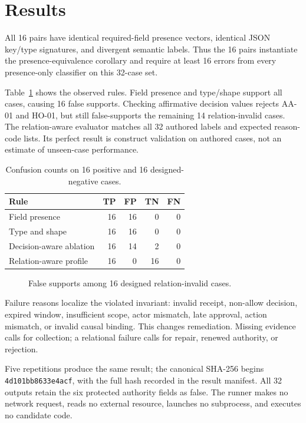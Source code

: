 \documentclass[preprint,12pt]{elsarticle}
\newcommand{\code}[1]{\texttt{#1}}
\begin{document}
\section{Results}

All 16 pairs have identical required-field presence vectors, identical JSON key/type signatures, and divergent semantic labels. Thus the 16 pairs instantiate the presence-equivalence corollary and require at least 16 errors from every presence-only classifier on this 32-case set.

Table~\ref{tab:results} shows the observed rules. Field presence and type/shape support all cases, causing 16 false supports. Checking affirmative decision values rejects AA-01 and HO-01, but still false-supports the remaining 14 relation-invalid cases. The relation-aware evaluator matches all 32 authored labels and expected reason-code lists. Its perfect result is construct validation on authored cases, not an estimate of unseen-case performance.

\begin{table}[t]
\centering
\caption{Confusion counts on 16 positive and 16 designed-negative cases.}
\label{tab:results}
\small
\begin{tabular}{@{}lrrrr@{}}
\toprule
Rule & TP & FP & TN & FN \\
\midrule
Field presence & 16 & 16 & 0 & 0 \\
Type and shape & 16 & 16 & 0 & 0 \\
Decision-aware ablation & 16 & 14 & 2 & 0 \\
Relation-aware profile & 16 & 0 & 16 & 0 \\
\bottomrule
\end{tabular}
\end{table}

\begin{figure}[t]
  \centering
  \resizebox{0.92\textwidth}{!}{}
  \caption{False supports among 16 designed relation-invalid cases.}
  \label{fig:false-support}
\end{figure}

Failure reasons localize the violated invariant: invalid receipt, non-allow decision, expired window, insufficient scope, actor mismatch, late approval, action mismatch, or invalid causal binding. This changes remediation. Missing evidence calls for collection; a relational failure calls for repair, renewed authority, or rejection.

Five repetitions produce the same result; the canonical SHA-256 begins \code{4d101bb8633e4acf}, with the full hash recorded in the result manifest. All 32 outputs retain the six protected authority fields as false. The runner makes no network request, reads no external resource, launches no subprocess, and executes no candidate code.
\end{document}
